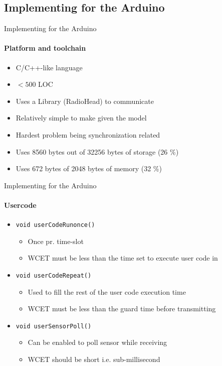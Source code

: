    \subsection{Implementing for the Arduino}
    \begin{frame}[t]{Implementing for the Arduino}\framesubtitle{Platform and toolchain}
        \begin{itemize}
            \item C/C++-like language
            \item $< 500$ LOC
            \item Uses a Library (RadioHead) to communicate
            \item Relatively simple to make given the model
            \item Hardest problem being synchronization related
            \item Uses 8560 bytes out of 32256 bytes of storage (26 \%)
            \item Uses 672 bytes of 2048 bytes of memory (32 \%)
        \end{itemize}

    \end{frame}
    \begin{frame}[t]{Implementing for the Arduino}\framesubtitle{Usercode}
        \begin{itemize}
            \item \texttt{void userCodeRunonce()}
            \begin{itemize}
                \item Once pr. time-slot
                \item WCET must be less than the time set to execute user code in
            \end{itemize}
            \item \texttt{void userCodeRepeat()}
            \begin{itemize}
                \item Used to fill the rest of the user code execution time
                \item WCET must be less than the guard time before transmitting
            \end{itemize}
            \item \texttt{void userSensorPoll()}
            \begin{itemize}
                \item Can be enabled to poll sensor while receiving
                \item WCET should be short i.e. sub-millisecond
            \end{itemize}
        \end{itemize}

    \end{frame}

